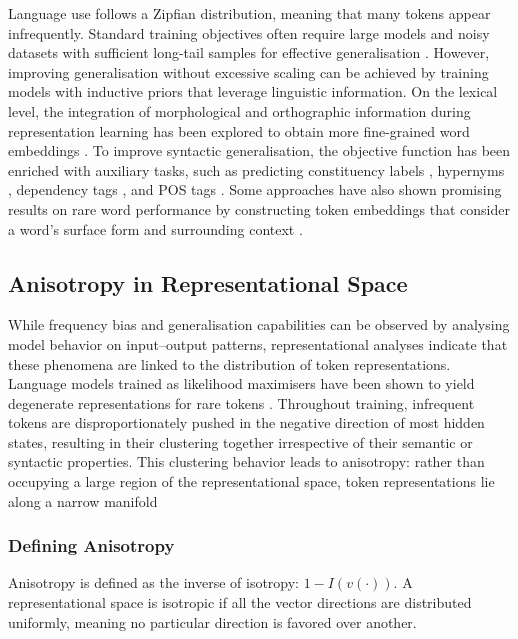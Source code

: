 Language use follows a Zipfian distribution, meaning that many tokens appear infrequently. Standard training objectives often require large models and noisy datasets with sufficient long-tail samples for effective generalisation \citep{zheng2022memorization}. However, improving generalisation without excessive scaling can be achieved by training models with inductive priors that leverage linguistic information. On the lexical level, the integration of morphological and orthographic information during representation learning has been explored to obtain more fine-grained word embeddings \citep{salle2018incorporating, vulic2017morphfitting, cotterel2015morphological, bhatia2016morphological, botha2014compositional}. To improve syntactic generalisation, the objective function has been enriched with auxiliary tasks, such as predicting constituency labels \citep{wang2023language}, hypernyms \citep{bai2022better}, dependency tags \citep{cui2022lert}, and POS tags \citep{diehlmartinez2023climb}. Some approaches have also shown promising results on rare word performance by constructing token embeddings that consider a word's surface form and surrounding context \citep{schick2019attentive, schick2020rare}.

\subsection{Anisotropy in Representational Space}
While frequency bias and generalisation capabilities can be observed by analysing model behavior on input--output patterns, representational analyses indicate that these phenomena are linked to the distribution of token representations. Language models trained as likelihood maximisers have been shown to yield degenerate representations for rare tokens \citep{gao2018representation}. Throughout training, infrequent tokens are disproportionately pushed in the negative direction of most hidden states, resulting in their clustering together irrespective of their semantic or syntactic properties. This clustering behavior leads to anisotropy: rather than occupying a large region of the representational space, token representations lie along a narrow manifold \citep{gao2018representation, ethayarajh2019contextual}

\subsubsection{Defining Anisotropy}

Anisotropy is defined as the inverse of isotropy: $1-I(v(\cdot))$. A representational space is isotropic if all the vector directions are distributed uniformly, meaning no particular direction is favored over another.

